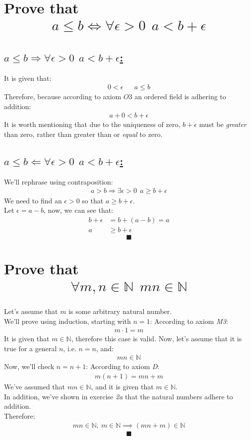 \documentclass[a4paper, 12pt]{article}
\newcommand{\sub}[1]{\subsection{\underline{#1}}}
\newcommand{\?}{\stackrel{?}{=}}
\newcommand{\eq}[1]{\begin{align*}#1\end{align*}}
\renewcommand{\qed}{$$\blacksquare$$}
\begin{document}
\begin{titlepage}
    
\end{titlepage}

\section{Prove that \eq{a\leq{b} \iff \forall\epsilon>0~~a<b+\epsilon}}
\sub{$ a\leq{b} \Rightarrow \forall\epsilon>0~~a<b+\epsilon $:}
It is given that: \eq{0<\epsilon && a\leq{b}}
Therefore, because according to axiom $O3$ an ordered field is adhering to addition:
\eq{a+0<b+\epsilon}
It is worth mentioning that due to the uniqueness of zero, $b+\epsilon$ must be \textit{greater} than zero, rather than greater than or \textit{equal} to zero.
\sub{$ a\leq{b} \Leftarrow \forall\epsilon>0~~a<b+\epsilon $:}
We'll rephrase using contraposition: \eq{a>b \Rightarrow \exists\epsilon>0~~a\geq{b+\epsilon}}
We need to find an $\epsilon>0$ so that $a\geq{b+\epsilon}$.\\
Let $\epsilon=a-b$, now, we can see that:
\eq{
    b+\epsilon &= b+(a-b) = a\\
    a&\geq{b+\epsilon}
}
\qed

\section{Prove that \eq{\forall{m,n}\in{\mathbb{N}}~~mn\in{\mathbb{N}}}}
Let's assume that $m$ is some arbitrary natural number.\\
We'll prove using induction, starting with $n=1$:
According to axiom \textit{M3}:
\eq{m\cdot{1}=m}
It is given that $m\in{\mathbb{N}}$, therefore this case is valid.
Now, let's assume that it is true for a general $n$, i.e. $n=n$, and:
\eq{mn\in{\mathbb{N}}}
Now, we'll check $n=n+1$:
According to axiom \textit{D}:
\eq{ m(n+1)=mn+m }
We've assumed that $mn\in{\mathbb{N}}$, and it is given that $m\in{\mathbb{N}}$.\\
In addition, we've shown in exercise \textit{2a} that the natural numbers adhere to addition.\\
Therefore: \eq{mn\in{\mathbb{N}},~m\in{\mathbb{N}}\implies(mn+m)\in{\mathbb{N}}}
\qed

\end{document}
